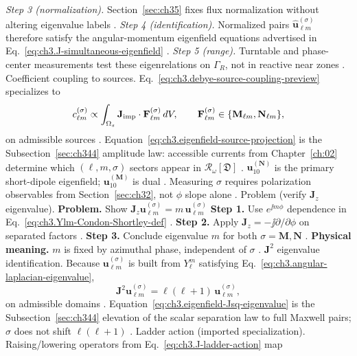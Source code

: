 \emph{Step 3 (normalization).} Section~\ref{sec:ch35} fixes flux normalization without altering eigenvalue labels .
\emph{Step 4 (identification).} Normalized pairs \(\widehat{\mathbf{u}}_{\ell m}^{(\sigma)}\) therefore satisfy the angular-momentum eigenfield equations advertised in Eq.~\eqref{eq:ch3.J-simultaneous-eigenfield} .
\emph{Step 5 (range).} Turntable and phase-center measurements test these eigenrelations on \(\Gamma_R\), not in reactive near zones .
Coefficient coupling to sources. Eq.~\eqref{eq:ch3.debye-source-coupling-preview} specializes to
\begin{equation}
\label{eq:ch3.eigenfield-source-projection}
c_{\ell m}^{(\sigma)}
\propto
\int_{\Omega_s}
\mathbf{J}_{\mathrm{imp}}\cdot\mathbf{F}_{\ell m}^{(\sigma)}\,dV,
\qquad
\mathbf{F}_{\ell m}^{(\sigma)}\in\{\mathbf{M}_{\ell m},\mathbf{N}_{\ell m}\},
\end{equation}
on admissible sources . Equation~\eqref{eq:ch3.eigenfield-source-projection}
is the Subsection~\ref{sec:ch344} amplitude law: accessible currents from Chapter~\ref{ch:02} determine which
\((\ell,m,\sigma)\) sectors appear in \(\mathcal{R}_\omega[\mathfrak{D}]\) .
\(\mathbf{u}_{10}^{(\mathbf{N})}\) is the primary short-dipole eigenfield; \(\mathbf{u}_{10}^{(\mathbf{M})}\) is dual
. Measuring \(\sigma\) requires polarization observables from Section~\ref{sec:ch32},
not \(\phi\) slope alone .
Problem (verify \(\mathbf{J}_{z}\) eigenvalue). \textbf{Problem.} Show \(\mathbf{J}_{z}\mathbf{u}_{\ell m}^{(\sigma)}=m\,\mathbf{u}_{\ell m}^{(\sigma)}\)
\textbf{Step 1.} Use \(e^{\jj m\phi}\) dependence in Eq.~\eqref{eq:ch3.Ylm-Condon-Shortley-def} .
\textbf{Step 2.} Apply \(\mathbf{J}_{z}=-\jj\partial/\partial\phi\) on separated factors .
\textbf{Step 3.} Conclude eigenvalue \(m\) for both \(\sigma=\mathbf{M},\mathbf{N}\) .
\textbf{Physical meaning.} \(m\) is fixed by azimuthal phase, independent of \(\sigma\) .
\(\mathbf{J}^{2}\) eigenvalue identification. Because \(\mathbf{u}_{\ell m}^{(\sigma)}\) is built from \(Y_{\ell}^{m}\) satisfying
Eq.~\eqref{eq:ch3.angular-laplacian-eigenvalue},
\begin{equation}
\label{eq:ch3.eigenfield-Jsq-eigenvalue}
\mathbf{J}^{2}\mathbf{u}_{\ell m}^{(\sigma)}
=
\ell(\ell+1)\,\mathbf{u}_{\ell m}^{(\sigma)},
\end{equation}
on admissible domains . Equation~\eqref{eq:ch3.eigenfield-Jsq-eigenvalue} is the
Subsection~\ref{sec:ch344} elevation of the scalar separation law to full Maxwell pairs; \(\sigma\) does not shift
\(\ell(\ell+1)\) .
Ladder action (imported specialization). Raising/lowering operators from Eq.~\eqref{eq:ch3.J-ladder-action} map
